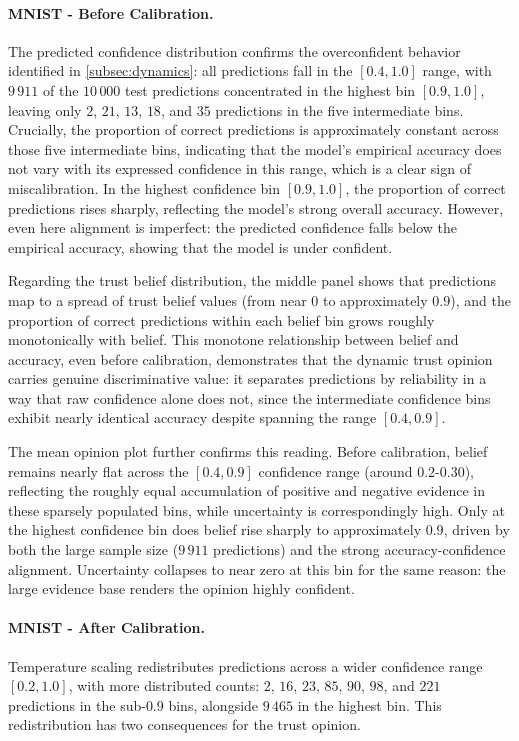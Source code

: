 \paragraph{MNIST - Before Calibration.}
The predicted confidence distribution confirms the overconfident behavior identified in \cref{subsec:dynamics}: all predictions fall in the $[0.4, 1.0]$ range, with $9\,911$ of the $10\,000$ test predictions concentrated in the highest bin $[0.9, 1.0]$, leaving only $2$, $21$, $13$, $18$, and $35$ predictions in the five intermediate bins. Crucially, the proportion of correct predictions is approximately constant across those five intermediate bins, indicating that the model's empirical accuracy does not vary with its expressed confidence in this range, which is a clear sign of miscalibration. In the highest confidence bin $[0.9,1.0]$, the proportion of correct predictions rises sharply, reflecting the model's strong overall accuracy. However, even here alignment is imperfect: the predicted confidence falls below the empirical accuracy, showing that the model is under confident.

Regarding the trust belief distribution, the middle panel shows that predictions map to a spread of trust belief values (from near $0$ to approximately $0.9$), and the proportion of correct predictions within each belief bin grows roughly monotonically with belief. This monotone relationship between belief and accuracy, even before calibration, demonstrates that the dynamic trust opinion carries genuine discriminative value: it separates predictions by reliability in a way that raw confidence alone does not, since the intermediate confidence bins exhibit nearly identical accuracy despite spanning the range $[0.4, 0.9]$.

The mean opinion plot further confirms this reading. Before calibration, belief remains nearly flat across the $[0.4, 0.9]$ confidence range (around $0.2$-$0.30$), reflecting the roughly equal accumulation of positive and negative evidence in these sparsely populated bins, while uncertainty is correspondingly high. Only at the highest confidence bin does belief rise sharply to approximately $0.9$, driven by both the large sample size ($9\,911$ predictions) and the strong accuracy-confidence alignment. Uncertainty collapses to near zero at this bin for the same reason: the large evidence base renders the opinion highly confident.

\paragraph{MNIST - After Calibration.}
Temperature scaling redistributes predictions across a wider confidence range $[0.2, 1.0]$, with more distributed counts: $2$, $16$, $23$, $85$, $90$, $98$, and $221$ predictions in the sub-$0.9$ bins, alongside $9\,465$ in the highest bin. This redistribution has two consequences for the trust opinion.

